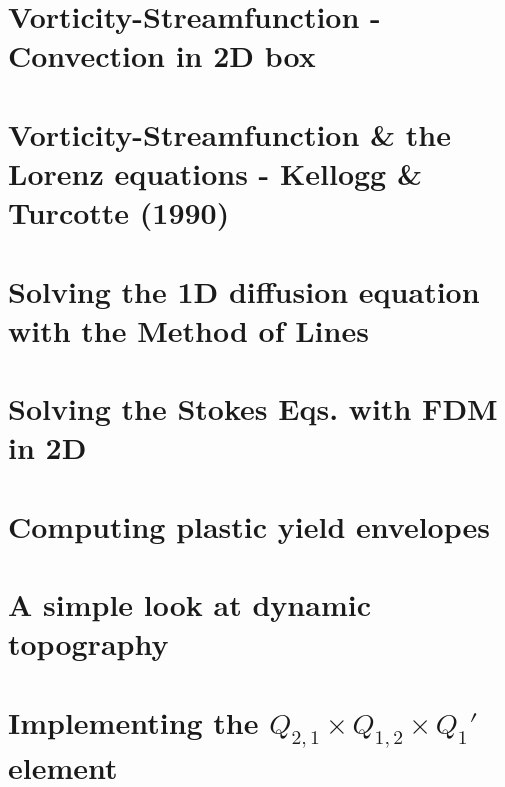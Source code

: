 \documentclass[a4paper,11pt]{report}
\begin{document}
\chapter{Vorticity-Streamfunction - Convection in 2D box \label{f155}} %

\chapter{Vorticity-Streamfunction \& the Lorenz equations - Kellogg \& Turcotte (1990)  \label{f156}} %

\chapter{Solving the 1D diffusion equation with the Method of Lines  \label{f157}} %

\chapter{Solving the Stokes Eqs. with FDM in 2D \label{f158}} %

\chapter{Computing plastic yield envelopes \label{f159}} %

\chapter{A simple look at dynamic topography \label{f160}} %

\chapter{Implementing the $Q_{2,1}\times Q_{1,2} \times Q_{1}'$ element \label{f161}} %
\end{document}

